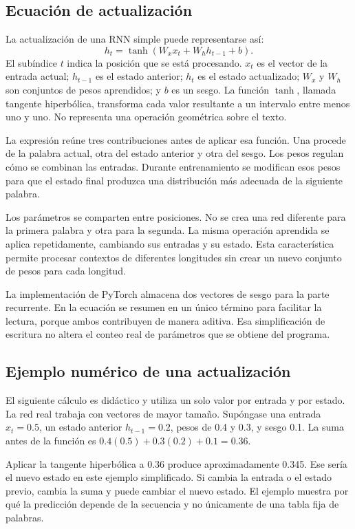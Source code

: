 \subsection{Ecuación de actualización}
La actualización de una RNN simple puede representarse así:
\begin{equation}\label{eq:rnn}
h_t=\tanh(W_x x_t+W_h h_{t-1}+b).
\end{equation}
El subíndice $t$ indica la posición que se está procesando. $x_t$ es el vector de la entrada actual; $h_{t-1}$ es el estado anterior; $h_t$ es el estado actualizado; $W_x$ y $W_h$ son conjuntos de pesos aprendidos; y $b$ es un sesgo. La función $\tanh$, llamada tangente hiperbólica, transforma cada valor resultante a un intervalo entre menos uno y uno. No representa una operación geométrica sobre el texto.

La expresión reúne tres contribuciones antes de aplicar esa función. Una procede de la palabra actual, otra del estado anterior y otra del sesgo. Los pesos regulan cómo se combinan las entradas. Durante entrenamiento se modifican esos pesos para que el estado final produzca una distribución más adecuada de la siguiente palabra.

Los parámetros se comparten entre posiciones. No se crea una red diferente para la primera palabra y otra para la segunda. La misma operación aprendida se aplica repetidamente, cambiando sus entradas y su estado. Esta característica permite procesar contextos de diferentes longitudes sin crear un nuevo conjunto de pesos para cada longitud.

La implementación de PyTorch almacena dos vectores de sesgo para la parte recurrente. En la ecuación se resumen en un único término para facilitar la lectura, porque ambos contribuyen de manera aditiva. Esa simplificación de escritura no altera el conteo real de parámetros que se obtiene del programa.

\subsection{Ejemplo numérico de una actualización}
El siguiente cálculo es didáctico y utiliza un solo valor por entrada y por estado. La red real trabaja con vectores de mayor tamaño. Supóngase una entrada $x_t=0.5$, un estado anterior $h_{t-1}=0.2$, pesos de 0.4 y 0.3, y sesgo 0.1. La suma antes de la función es $0.4(0.5)+0.3(0.2)+0.1=0.36$.

Aplicar la tangente hiperbólica a 0.36 produce aproximadamente 0.345. Ese sería el nuevo estado en este ejemplo simplificado. Si cambia la entrada o el estado previo, cambia la suma y puede cambiar el nuevo estado. El ejemplo muestra por qué la predicción depende de la secuencia y no únicamente de una tabla fija de palabras.

